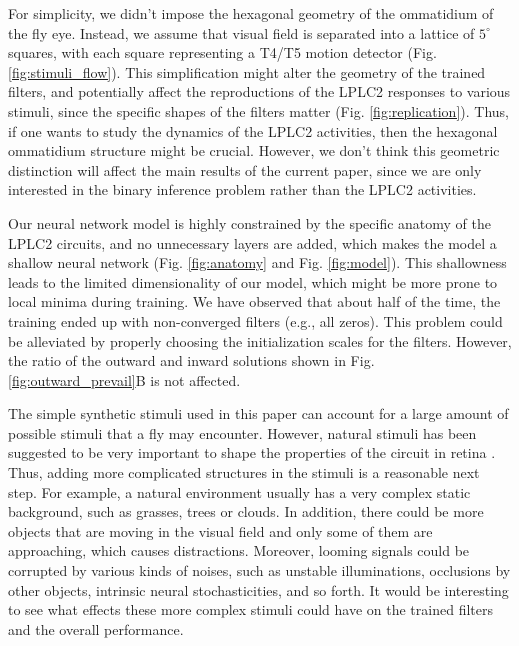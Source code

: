 \documentclass[9pt,lineno]{elife}
\begin{document}
For simplicity, we didn't impose the hexagonal geometry of the ommatidium of the fly eye. Instead, we assume that visual field is separated into a lattice of $5^{\circ}$ squares, with each square representing a T4/T5 motion detector (Fig. \ref{fig:stimuli_flow}). This simplification might alter the geometry of the trained filters, and potentially affect the reproductions of the LPLC2 responses to various stimuli, since the specific shapes of the filters matter (Fig. \ref{fig:replication}). Thus, if one wants to study the dynamics of the LPLC2 activities, then the hexagonal ommatidium structure might be crucial. However, we don't think this geometric distinction will affect the main results of the current paper, since we are only interested in the binary inference problem rather than the LPLC2 activities.

Our neural network model is highly constrained by the specific anatomy of the LPLC2 circuits, and no unnecessary layers are added, which makes the model a shallow neural network (Fig. \ref{fig:anatomy} and Fig. \ref{fig:model}). This shallowness leads to the limited dimensionality of our model, which might be more prone to local minima during training. We have observed that about half of the time, the training ended up with non-converged filters (e.g., all zeros). This problem could be alleviated by properly choosing the initialization scales for the filters. However, the ratio of the outward and inward solutions shown in Fig. \ref{fig:outward_prevail}B is not affected.


The simple synthetic stimuli used in this paper can account for a large amount of possible stimuli that a fly may encounter. However, natural stimuli has been suggested to be very important to shape the properties of the circuit in retina \citep{tanaka2019deep}. Thus, adding more complicated structures in the stimuli is a reasonable next step. For example, a natural environment usually has a very complex static background, such as grasses, trees or clouds. In addition, there could be more objects that are moving in the visual field and only some of them are approaching, which causes distractions. Moreover, looming signals could be corrupted by various kinds of noises, such as unstable illuminations, occlusions by other objects, intrinsic neural stochasticities, and so forth. It would be interesting to see what effects these more complex stimuli could have on the trained filters and the overall performance. 
\end{document}
